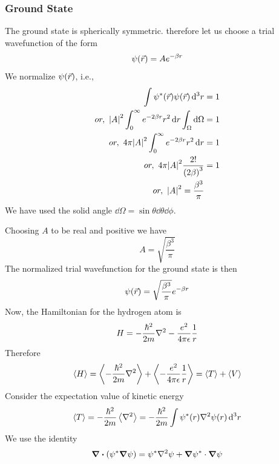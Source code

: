	\subsubsection{Ground State}
	The ground state is spherically symmetric. therefore let us choose a trial wavefunction of the form
	\begin{align}
		\psi\qty(\vec{r}) = A e^{-\beta r}
	\end{align}
	We normalize $\psi\qty(\vec{r})$, i.e.,
	\begin{align*}
		\int \psi^*\qty(\vec{r}) \psi\qty(\vec{r}) \dd[3]{r} &= 1 \\
		or, \ \abs{A}^2 \int_{0}^{\infty} e^{-2\beta r} r^2 \dd{r} \int_{\Omega} \dd{\Omega} &= 1 \\
		or, \ 4\pi \abs{A}^2 \int_{0}^{\infty} e^{-2\beta r} r^2 \dd{r} &= 1 \\
		or, \ 4\pi \abs{A}^2 \frac{2 !}{\qty(2\beta)^3} &= 1 \\
		or, \ \abs{A}^2 = \frac{\beta^3}{\pi}
	\end{align*}
	We have used the solid angle $\dd{\Omega} = \sin\theta \dd{\theta} \dd{\phi}$.
	
	Choosing $A$ to be real and positive we have
	\begin{equation}
		A = \sqrt{\frac{\beta^3}{\pi}}
	\end{equation}
	The normalized trial wavefunction for the ground state is then
	\begin{equation}
		\psi\qty(\vec{r}) = \sqrt{\frac{\beta^3}{\pi}} e ^{-\beta r}
	\end{equation}
	Now, the Hamiltonian for the hydrogen atom is
	\begin{align}
		H = - \frac{\hbar^2}{2 m} \laplacian{} - \frac{e^2}{4\pi\epsilon}\frac{1}{r}
	\end{align}
	Therefore
	\begin{align}
		\expval{H} = \expval{- \frac{\hbar^2}{2 m} \laplacian{}}  + \expval{- \frac{e^2}{4\pi\epsilon}\frac{1}{r}}  = \expval{T}  + \expval{V} 
	\end{align}
	Consider the expectation value of kinetic energy
	\begin{align}
		\expval{T}  =  - \frac{\hbar^2}{2 m}\expval{\laplacian{}} = - \frac{\hbar^2}{2 m} \int \psi^*\qty(r) \laplacian{\psi\qty(r)} \dd[3]{r}
	\end{align}
	We use the identity
	\begin{align}
		\divergence \qty(\psi^* \grad{\psi}) = \psi^*\laplacian{\psi} + \grad{\psi^*} \cdot \grad{\psi}
	\end{align}
	

